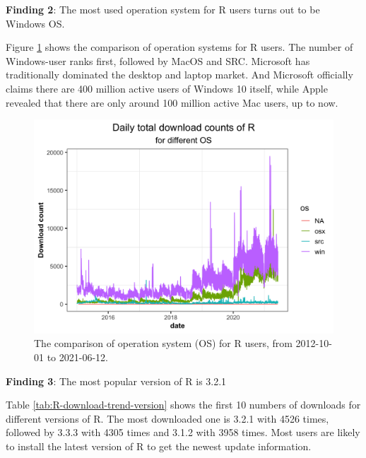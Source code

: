 \documentclass[
]{book}
\newenvironment{discovery}[1]{%
  \begin{tcolorbox}[colback=blue!30,colframe=blue!80!black]#1}{\end{tcolorbox}}
\begin{document}
\begin{discovery}
\textbf{Finding 2}: The most used operation system for R users turns out
to be Windows OS.
\end{discovery}

Figure \ref{fig:R-download-trend-os} shows the comparison of operation systems for R users. The number of Windows-user ranks first, followed by MacOS and SRC. Microsoft has traditionally dominated the desktop and laptop market. And Microsoft officially claims there are 400 million active users of Windows 10 itself, while Apple revealed that there are only around 100 million active Mac users, up to now.\autocite{warren2017}



\begin{figure}

{\centering \includegraphics{figures/R-download-trend-os-1} 

}

\caption{The comparison of operation system (OS) for R users, from 2012-10-01 to 2021-06-12.}\label{fig:R-download-trend-os}
\end{figure}

\begin{discovery}
\textbf{Finding 3}: The most popular version of R is 3.2.1
\end{discovery}

Table \ref{tab:R-download-trend-version} shows the first 10 numbers of downloads for different versions of R. The most downloaded one is 3.2.1 with 4526 times, followed by 3.3.3 with 4305 times and 3.1.2 with 3958 times. Most users are likely to install the latest version of R to get the newest update information.
\end{document}
